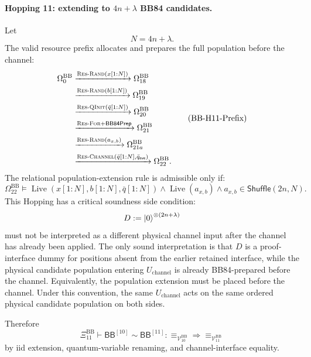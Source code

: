 \documentclass{report}
\theoremstyle{defn_style}
\providecommand{\Live}{\operatorname{Live}}
\providecommand{\HopBB}[1]{\mathsf{BB}^{[#1]}}
\begin{document}
\paragraph{Hopping 11: extending to \(4n+\lambda\) BB84 candidates.}
Let
\[
N=4n+\lambda.
\]
The valid resource prefix allocates and prepares the full population before the
channel:
\[
\begin{aligned}
\Omega^{\mathrm{BB}}_0
&\xrightarrow{\textsc{Res-Rand}(x[1{:}N])}
\Omega^{\mathrm{BB}}_{18}
\\
&\xrightarrow{\textsc{Res-Rand}(b[1{:}N])}
\Omega^{\mathrm{BB}}_{19}
\\
&\xrightarrow{\textsc{Res-QInit}(\bar q[1{:}N])}
\Omega^{\mathrm{BB}}_{20}
\\
&\xrightarrow{\textsc{Res-For}+\mathsf{BB84Prep}}
\Omega^{\mathrm{BB}}_{21}
\\
&\xrightarrow{\textsc{Res-Rand}(a_{x,b})}
\Omega^{\mathrm{BB}}_{21a}
\\
&\xrightarrow{\textsc{Res-Channel}(\bar q[1{:}N],\bar q_{\mathsf{eve}})}
\Omega^{\mathrm{BB}}_{22}.
\end{aligned}
\tag{BB-H11-Prefix}\label{BB-H11-Prefix}
\]
The relational population-extension rule is admissible only if:
\[
\Omega^{\mathrm{BB}}_{22}
\models
\Live(x[1{:}N],b[1{:}N],\bar q[1{:}N])
\land
\Live(a_{x,b})
\land
a_{x,b}\in\mathsf{Shuffle}(2n,N).
\tag{BB-H11-Req}
\]
This Hopping has a critical soundness side condition:
\[
D:=\ket0^{\otimes(2n+\lambda)}
\]
must not be interpreted as a different physical channel input after the channel
has already been applied.  The only sound interpretation is that \(D\) is a
proof-interface dummy for positions absent from the earlier retained interface,
while the physical candidate population entering \(U_{\mathrm{channel}}\) is
already BB84-prepared before the channel.  Equivalently, the population
extension must be placed before the channel.  Under this convention, the same
\(U_{\mathrm{channel}}\) acts on the same ordered physical candidate population
on both sides.

Therefore
\[
\Xi^{\mathrm{BB}}_{11}
\vdash
\HopBB{10}\sim\HopBB{11}:
\equiv_{\mathcal V^{\mathrm{BB}}_{10}}
\Longrightarrow
\equiv_{\mathcal V^{\mathrm{BB}}_{11}}
\tag{BB-H11-Rel}\label{BB-H11-Rel}
\]
by iid extension, quantum-variable renaming, and channel-interface equality.
\end{document}
